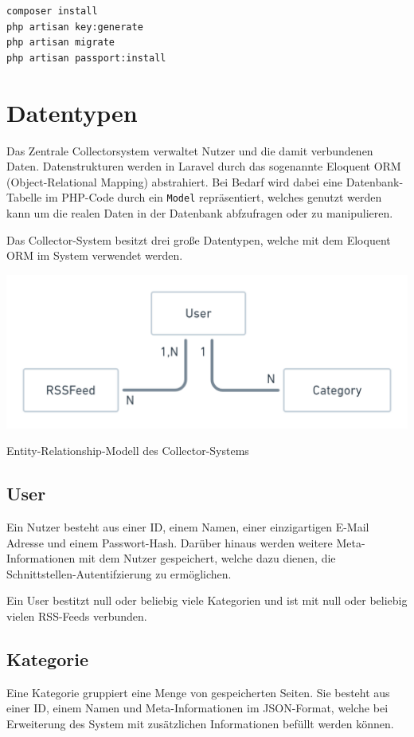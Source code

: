         
        \begin{lstlisting}[caption={Installationsprozess mit Artisan und Composer}]
composer install
php artisan key:generate
php artisan migrate
php artisan passport:install
        \end{lstlisting}

\section{Datentypen}
    Das Zentrale Collectorsystem verwaltet Nutzer und die damit verbundenen Daten.
    Datenstrukturen werden in Laravel durch das sogenannte Eloquent ORM (Object-Relational Mapping) abstrahiert. Bei Bedarf wird dabei eine Datenbank-Tabelle im PHP-Code durch ein \texttt{Model} repräsentiert, welches genutzt werden kann um die realen Daten in der Datenbank abfzufragen oder zu manipulieren.
    
    Das Collector-System besitzt drei große Datentypen, welche mit dem Eloquent ORM im System verwendet werden.
    
    \begin{center}
        \includegraphics[width=\textwidth]{images/collector-erm.png}
        \caption{Entity-Relationship-Modell des Collector-Systems}
    \end{center}
    
    \subsection{User}
        Ein Nutzer besteht aus einer ID, einem Namen, einer einzigartigen E-Mail Adresse und einem Passwort-Hash. Darüber hinaus werden weitere Meta-Informationen mit dem Nutzer gespeichert, welche dazu dienen, die Schnittstellen-Autentifzierung zu ermöglichen.
        
        Ein User bestitzt null oder beliebig viele Kategorien und ist mit null oder beliebig vielen RSS-Feeds verbunden.
    \subsection{Kategorie}
        Eine Kategorie gruppiert eine Menge von gespeicherten Seiten. Sie besteht aus einer ID, einem Namen und Meta-Informationen im JSON-Format, welche bei Erweiterung des System mit zusätzlichen Informationen befüllt werden können.
        
